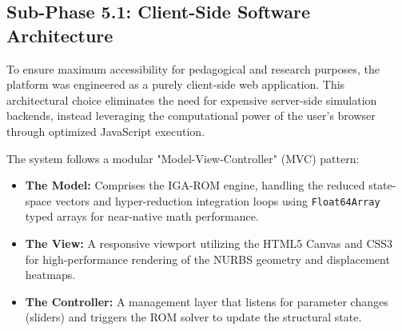 \subsection{Sub-Phase 5.1: Client-Side Software Architecture}
\label{subsec:web_architecture}

To ensure maximum accessibility for pedagogical and research purposes, the platform was engineered as a purely client-side web application. This architectural choice eliminates the need for expensive server-side simulation backends, instead leveraging the computational power of the user's browser through optimized JavaScript execution.

The system follows a modular "Model-View-Controller" (MVC) pattern:
\begin{itemize}
    \item \textbf{The Model:} Comprises the IGA-ROM engine, handling the reduced state-space vectors and hyper-reduction integration loops using \texttt{Float64Array} typed arrays for near-native math performance.
    \item \textbf{The View:} A responsive viewport utilizing the HTML5 Canvas and CSS3 for high-performance rendering of the NURBS geometry and displacement heatmaps.
    \item \textbf{The Controller:} A management layer that listens for parameter changes (sliders) and triggers the ROM solver to update the structural state.
\end{itemize}

